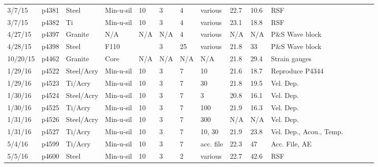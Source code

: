 \begin{landscape}
\begin{longtable} {lllllllllllllll}
3/7/15   & p4381      & Steel            & Min-u-sil    & 10           & 3         & 4             & various                      & 22.7        & 10.6     & RSF\\
3/7/15   & p4382      & Ti         & Min-u-sil    & 10           & 3         & 4             & various                      & 23.1        & 18.8     & RSF\\
4/27/15  & p4397      & Granite          & N/A          & N/A          & N/A       & 4             & various                      & N/A         & N/A      & P\&S Wave block\\
4/28/15  & p4398      & Steel            & F110         &              & 3         & 25            & various                      & 21.8        & 33       & P\&S Wave block\\
10/20/15 & p4462      & Granite          & Core         & N/A          & N/A       & N/A           & N/A                          & 21.8        & 29.4     & Strain gauges\\
1/29/16  & p4522      & Steel/Acry    & Min-u-sil    & 10           & 3         & 7             & 10                           & 21.6        & 18.7     & Reproduce P4344\\
1/29/16  & p4523      & Ti/Acry & Min-u-sil    & 10           & 3         & 7             & 30                           & 21.8        & 19.5     & Vel. Dep.\\
1/30/16  & p4524      & Steel/Acry    & Min-u-sil    & 10           & 3         & 7             & 3                            & 20.8        & 16.1     & Vel. Dep.\\
1/30/16  & p4525      & Ti/Acry & Min-u-sil    & 10           & 3         & 7             & 100                          & 21.9        & 16.3     & Vel. Dep.\\
1/31/16  & p4526      & Steel/Acry    & Min-u-sil    & 10           & 3         & 7             & 300                          & N/A         & N/A      & Vel. Dep.\\
1/31/16  & p4527      & Ti/Acry & Min-u-sil    & 10           & 3         & 7             & 10, 30                       & 21.9        & 23.8     & Vel. Dep., Acou., Temp.\\
5/4/16   & p4599      & Ti/Acry & Min-u-sil    & 10           & 3         & 7             & acc. file            & 22.3        & 47       & Acc. File, AE\\
5/5/16   & p4600      & Steel            & Min-u-sil    & 10           & 3         & 2             & various                      & 22.7        & 42.6     & RSF\\

\end{longtable}
\end{landscape}
